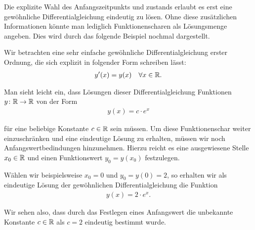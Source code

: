 \par
Die explizite Wahl des Anfangszeitpunkts und  zustands erlaubt es erst eine gewöhnliche Differentialgleichung eindeutig zu lösen.
Ohne diese zusätzlichen Informationen könnte man lediglich Funktionenscharen als Lösungsmenge angeben.
Dies wird durch das folgende Beispiel nochmal dargestellt.
\label{ode/repetition:example-6}
\begin{example}{}{}



\par
Wir betrachten eine sehr einfache gewöhnliche Differentialgleichung erster Ordnung, die sich explizit in folgender Form schreiben lässt:
\begin{align*}
y'(x) = y(x) \quad \forall x \in \mathbb{R}.
\end{align*}
\par
Man sieht leicht ein, dass Lösungen dieser Differentialgleichung Funktionen \(y \colon \mathbb{R} \rightarrow \mathbb{R}\) von der Form
\begin{align*}
y(x) = c\cdot e^x
\end{align*}
\par
für eine beliebige Konstante \(c \in \mathbb{R}\) sein müssen.
Um diese Funktionenschar weiter einzuschränken und eine eindeutige Lösung zu erhalten, müssen wir noch Anfangswertbedindungen hinzunehmen.
Hierzu reicht es eine ausgewiesene Stelle \(x_0 \in \mathbb{R}\) und einen Funktionswert \(y_0 = y(x_0)\) festzulegen.

\par
Wählen wir beispielsweise \(x_0 = 0\) und \(y_0 = y(0) = 2\), so erhalten wir als eindeutige Lösung der gewöhnlichen Differentialgleichung die Funktion
\begin{align*}
y(x) = 2\cdot e^x.
\end{align*}
\par
Wir sehen also, dass durch das Festlegen eines Anfangswert die unbekannte Konstante \(c \in \mathbb{R}\) als \(c=2\) eindeutig bestimmt wurde.
\end{example}


